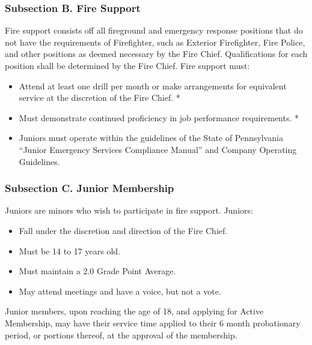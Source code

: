 ﻿\documentclass[12pt,letterpaper]{article}
\begin{document}
\subsubsection*{Subsection B. Fire Support}
Fire support consists off all fireground and emergency response positions that do not have the requirements of Firefighter, such as Exterior Firefighter, Fire Police, and other positions as deemed necessary by the Fire Chief.  Qualifications for each position shall be determined by the Fire Chief.  Fire support must:
\begin{itemize}
\item Attend at least one drill per month or make arrangements for equivalent service at the discretion of the Fire Chief.
*\item Must demonstrate continued proficiency in job performance requirements.
*\item Juniors must operate within the guidelines of the State of Pennsylvania “Junior Emergency Services Compliance Manual” and Company Operating Guidelines.
\end{itemize}

\subsubsection*{Subsection C. Junior Membership}
Juniors  are minors who wish to participate in fire support.  Juniors:
\begin{itemize}
\item Fall under the discretion and direction of the Fire Chief.
\item Must be 14 to 17 years old.
\item Must maintain a 2.0 Grade Point Average.
\item May attend meetings and have a voice, but not a vote.
\end{itemize}
Junior members, upon reaching the age of 18, and applying for Active Membership, may have their service time applied to their 6 month probationary period, or portions thereof, at the approval of the membership.
\end{document}
